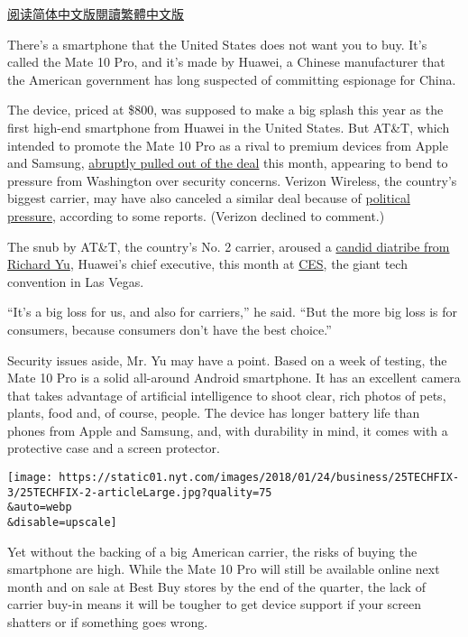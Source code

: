 \href{https://cn.nytimes.com/technology/20180126/huawei-mate-10-pro-smartphone-review/}{阅读简体中文版}\href{https://cn.nytimes.com/technology/20180126/huawei-mate-10-pro-smartphone-review/zh-hant/}{閱讀繁體中文版}

There's a smartphone that the United States does not want you to buy.
It's called the Mate 10 Pro, and it's made by Huawei, a Chinese
manufacturer that the American government has long suspected of
committing espionage for China.

The device, priced at \$800, was supposed to make a big splash this year
as the first high-end smartphone from Huawei in the United States. But
AT\&T, which intended to promote the Mate 10 Pro as a rival to premium
devices from Apple and Samsung,
\href{https://www.nytimes.com/2018/01/09/business/att-huawei-mate-smartphone.html}{abruptly
pulled out of the deal} this month, appearing to bend to pressure from
Washington over security concerns. Verizon Wireless, the country's
biggest carrier, may have also canceled a similar deal because of
\href{https://www.cnet.com/news/verizon-huawei-mate-10-pro-political-pressure-ces/}{political
pressure}, according to some reports. (Verizon declined to comment.)

The snub by AT\&T, the country's No. 2 carrier, aroused a
\href{https://www.theverge.com/2018/1/9/16871538/huawei-ces-2018-event-ceo-richard-yu-keynote-speech}{candid
diatribe from Richard Yu}, Huawei's chief executive, this month at
\href{https://www.nytimes.com/interactive/2018/01/08/technology/ces-2018-reader-questions.html}{CES},
the giant tech convention in Las Vegas.

``It's a big loss for us, and also for carriers,'' he said. ``But the
more big loss is for consumers, because consumers don't have the best
choice.''

Security issues aside, Mr. Yu may have a point. Based on a week of
testing, the Mate 10 Pro is a solid all-around Android smartphone. It
has an excellent camera that takes advantage of artificial intelligence
to shoot clear, rich photos of pets, plants, food and, of course,
people. The device has longer battery life than phones from Apple and
Samsung, and, with durability in mind, it comes with a protective case
and a screen protector.

\texttt{[image: https://static01.nyt.com/images/2018/01/24/business/25TECHFIX-3/25TECHFIX-2-articleLarge.jpg?quality=75\\\&auto=webp\\\&disable=upscale]}

Yet without the backing of a big American carrier, the risks of buying
the smartphone are high. While the Mate 10 Pro will still be available
online next month and on sale at Best Buy stores by the end of the
quarter, the lack of carrier buy-in means it will be tougher to get
device support if your screen shatters or if something goes wrong.

